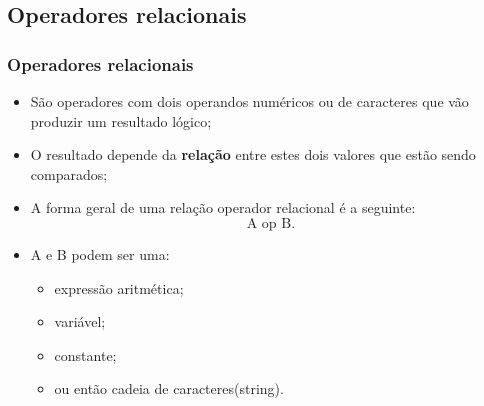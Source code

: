 \documentclass[xcolor=table]{beamer}
\newenvironment{stepitemize}{\begin{itemize}[<+->]}{\end{itemize} }
\begin{document}
\subsection{Operadores relacionais}

\begin{frame}%

\frametitle{Operadores relacionais}

\begin{stepitemize}
\item S\~{a}o operadores com dois operandos num\'{e}ricos ou de caracteres
que v\~{a}o produzir um resultado l\'{o}gico;

\item O resultado depende da \textbf{rela\c{c}\~{a}o} entre estes dois
valores que est\~{a}o sendo comparados;

\item A forma geral de uma rela\c{c}\~{a}o operador relacional \'{e} a
seguinte:%
\[
\text{A op B.} 
\]

\item A e B podem ser uma:

\begin{itemize}
\item express\~{a}o aritm\'{e}tica;

\item vari\'{a}vel;

\item constante;

\item ou ent\~{a}o cadeia de caracteres(string).
\end{itemize}
\end{stepitemize}

\transboxout%
\end{frame}%
\end{document}
